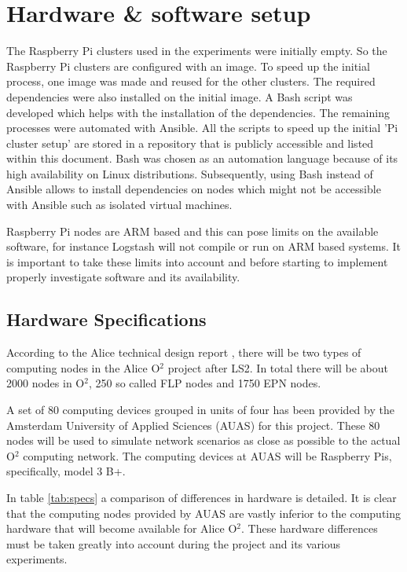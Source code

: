 \documentclass[]{article}
\begin{document}
\section{Hardware \& software setup}
The Raspberry Pi clusters used in the experiments were initially empty. So the Raspberry Pi clusters are configured with an image. To speed up the initial process, one image was made and reused for the other clusters. The required dependencies were also installed on the initial image. A Bash script was developed which helps with the installation of the dependencies. The remaining processes were automated with Ansible. All the scripts to speed up the initial 'Pi cluster setup' are stored in a repository that is publicly accessible and listed within this document. Bash was chosen as an automation language because of its high availability on Linux distributions. Subsequently, using Bash instead of Ansible allows to install dependencies on nodes which might not be accessible with Ansible such as isolated virtual machines.

Raspberry Pi nodes are ARM based and this can pose limits on the available software, for instance Logstash will not compile or run on ARM based systems. It is important to take these limits into account and before starting to implement properly investigate software and its availability.

\subsection{Hardware Specifications}
According to the Alice technical design report \cite{Buncic:2011297}, there will be two types of computing nodes in the Alice O$^2$ project after LS2. In total there will be about 2000 nodes in O$^2$, 250 so called FLP nodes and 1750 EPN nodes.

A set of 80 computing devices grouped in units of four has been provided by the Amsterdam University of Applied Sciences (AUAS) for this project. These 80 nodes will be used to simulate network scenarios as close as possible to the actual O$^2$ computing network. The computing devices at AUAS will be Raspberry Pis, specifically, model 3 B+.

In table \ref{tab:specs} a comparison of differences in hardware is detailed. It is clear that the computing nodes provided by AUAS are vastly inferior to the computing hardware that will become available for Alice O$^2$. These hardware differences must be taken greatly into account during the project and its various experiments.
\end{document}

